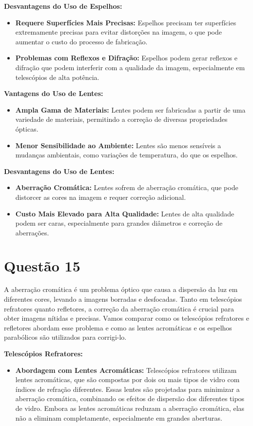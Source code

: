 \documentclass[a4paper, 12pt]{article}
\begin{document}
\textbf{Desvantagens do Uso de Espelhos:}
\begin{itemize}
    \item \textbf{Requere Superfícies Mais Precisas:} Espelhos precisam ter superfícies extremamente precisas para evitar distorções na imagem, o que pode aumentar o custo do processo de fabricação.
    \item \textbf{Problemas com Reflexos e Difração:} Espelhos podem gerar reflexos e difração que podem interferir com a qualidade da imagem, especialmente em telescópios de alta potência.
\end{itemize}

\textbf{Vantagens do Uso de Lentes:}
\begin{itemize}
    \item \textbf{Ampla Gama de Materiais:} Lentes podem ser fabricadas a partir de uma variedade de materiais, permitindo a correção de diversas propriedades ópticas.
    \item \textbf{Menor Sensibilidade ao Ambiente:} Lentes são menos sensíveis a mudanças ambientais, como variações de temperatura, do que os espelhos.
\end{itemize}

\textbf{Desvantagens do Uso de Lentes:}
\begin{itemize}
    \item \textbf{Aberração Cromática:} Lentes sofrem de aberração cromática, que pode distorcer as cores na imagem e requer correção adicional.
    \item \textbf{Custo Mais Elevado para Alta Qualidade:} Lentes de alta qualidade podem ser caras, especialmente para grandes diâmetros e correção de aberrações.
\end{itemize}

\section*{Questão 15}
A aberração cromática é um problema óptico que causa a dispersão da luz em diferentes cores, levando a imagens borradas e desfocadas. Tanto em telescópios refratores quanto refletores, a correção da aberração cromática é crucial para obter imagens nítidas e precisas. Vamos comparar como os telescópios refratores e refletores abordam esse problema e como as lentes acromáticas e os espelhos parabólicos são utilizados para corrigi-lo.

\textbf{Telescópios Refratores:}
\begin{itemize}
    \item \textbf{Abordagem com Lentes Acromáticas:} Telescópios refratores utilizam lentes acromáticas, que são compostas por dois ou mais tipos de vidro com índices de refração diferentes. Essas lentes são projetadas para minimizar a aberração cromática, combinando os efeitos de dispersão dos diferentes tipos de vidro. Embora as lentes acromáticas reduzam a aberração cromática, elas não a eliminam completamente, especialmente em grandes aberturas.
\end{itemize}
\end{document}

